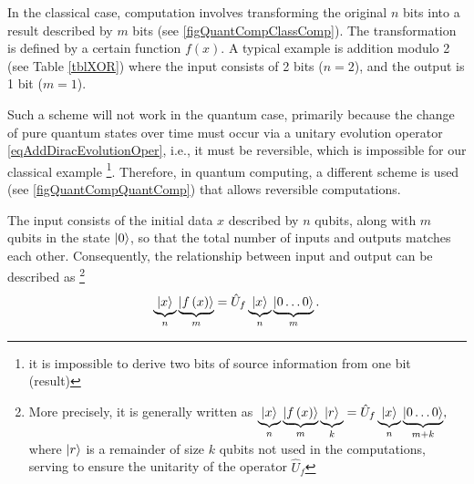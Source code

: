 

In the classical case, computation involves transforming the original $n$ bits into a result described by $m$ bits (see \autoref{figQuantCompClassComp}). The transformation is defined by a certain function $f\left(x\right)$. A typical example is addition modulo 2 (see Table \ref{tblXOR}) where the input consists of 2 bits ($n = 2$), and the output is 1 bit ($m = 1$).



Such a scheme will not work in the quantum case, primarily because the change of pure quantum states over time must occur via a unitary evolution operator \eqref{eqAddDiracEvolutionOper}, i.e., it must be reversible, which is impossible for our classical example \footnote{it is impossible to derive two bits of source information from one bit (result)}. Therefore, in quantum computing, a different scheme is used (see \autoref{figQuantCompQuantComp}) that allows reversible computations.

The input consists of the initial data $x$ described by $n$ qubits, along with $m$ qubits in the state $\ket{0}$, so that the total number of inputs and outputs matches each other. Consequently, the relationship between input and output can be described as
\footnote{More precisely, it is generally written as 
$
\underbrace{\ket{x}}_n
\underbrace{\left|f\left(x\right)\right>}_m
\underbrace{\ket{r}}_k = 
\hat{U}_f \underbrace{\ket{x}}_n
\underbrace{\left|0 \dots 0\right>}_{m+k},
$
where $\ket{r}$ is a remainder of size $k$ qubits not used in the computations, serving to ensure the unitarity of the operator $\hat{U}_f$
}
\begin{equation}
\underbrace{\ket{x}}_n
\underbrace{\left|f\left(x\right)\right>}_m = 
\hat{U}_f \underbrace{\ket{x}}_n\underbrace{\left|0 \dots
  0\right>}_m.
\label{eqQuantCompQuantComp}
\end{equation}
